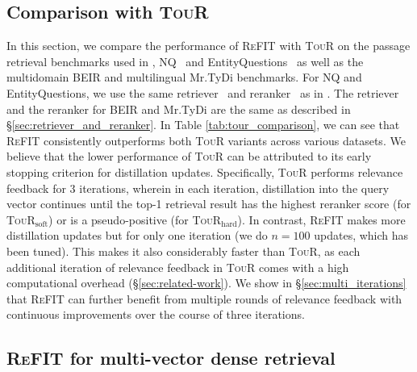 \subsection{Comparison with \textsc{TouR}}
\label{sec:tour_comparison}

In this section, we compare the performance of \textsc{ReFIT} with \textsc{TouR} on the passage retrieval benchmarks used in \cite{sung2023optimizing}, NQ~\cite{kwiatkowski2019natural} and EntityQuestions~\cite{sciavolino-etal-2021-simple} as well as the multidomain BEIR and multilingual Mr.TyDi benchmarks. For NQ  and EntityQuestions, we use the same retriever~\cite{karpukhin2020dense} and reranker~\cite{fajcik-etal-2021-r2-d2} as in \cite{sung2023optimizing}. The retriever and the reranker for BEIR and Mr.TyDi are the same as described in \S{\ref{sec:retriever_and_reranker}}. 
In Table \ref{tab:tour_comparison}, we can see that \textsc{ReFIT} consistently outperforms both \textsc{TouR} variants across various datasets. 
We believe that the lower performance of \textsc{TouR} can be attributed to its early stopping criterion for distillation updates. Specifically, \textsc{TouR} performs relevance feedback for 3 iterations, wherein in each iteration, distillation into the query vector continues until the top-1 retrieval result has the highest reranker score (for \textsc{TouR}$_{\text{soft}}$) or is a pseudo-positive (for \textsc{TouR}$_{\text{hard}}$). 
In contrast, \textsc{ReFIT} makes more distillation updates but for only one iteration (we do $n=100$ updates, which has been tuned). 
This makes it also considerably faster than \textsc{TouR}, as each additional iteration of relevance feedback in \textsc{TouR} comes with a high computational overhead (\S{\ref{sec:related-work}}). 
We show in \S{\ref{sec:multi_iterations}} that \textsc{ReFIT} can further benefit from multiple rounds of relevance feedback with continuous improvements over the course of three iterations.

\subsection{\textsc{ReFIT} for multi-vector dense retrieval}

